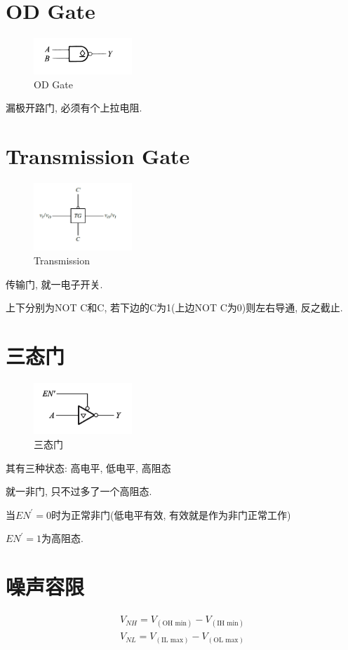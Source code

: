 \documentclass[scheme=chinese,a4paper]{report}
\begin{document}
\section{OD Gate}
\begin{figure}[H]
\centering
\includegraphics[width=0.33\textwidth]{cmos_od.png}
\caption{OD Gate}
\end{figure}
漏极开路门, 必须有个上拉电阻. 
\section{Transmission Gate}
\begin{figure}[H]
\centering
\includegraphics[width=0.33\textwidth]{cmos_tranmission.png}
\caption{Transmission}
\end{figure}
传输门, 就一电子开关. \par
上下分别为NOT C和C, 若下边的C为1(上边NOT C为0)则左右导通, 反之截止. 
\section{三态门}
\begin{figure}[H]
\centering
\includegraphics[width=0.33\textwidth]{cmos_tri_condition.png}
\caption{三态门}
\end{figure}
其有三种状态: 高电平, 低电平, 高阻态\par
就一非门, 只不过多了一个高阻态. \par
当$EN^\prime=0$时为正常非门(低电平有效, 有效就是作为非门正常工作)\par
$EN^\prime=1$为高阻态.
\section{噪声容限}
\begin{align*}
    V_{NH}=V_{(\text{OH min})}-V_{(\text{IH min})}\\
    V_{NL}=V_{(\text{IL max})}-V_{(\text{OL max})}
\end{align*} 
\end{document}

